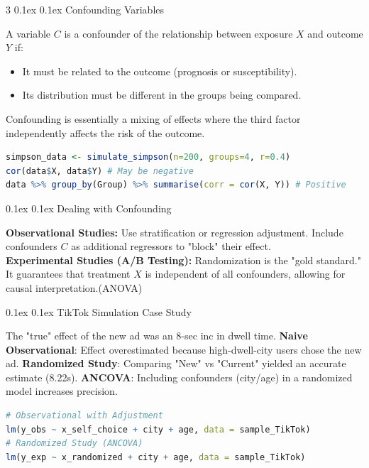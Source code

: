 \documentclass[8pt,landscape]{article}
\makeatletter
\renewcommand{\section}{\@startsection{section}{2}{0pt}%
    {0.1ex}%
    {0.1ex}%
    {\fontsize{8}{9}\bfseries\color{red}}} %
\newcommand{\smalltext}[1]{
  {\fontsize{8}{9}\selectfont\sloppy #1\par}
}
\makeatother
\begin{document}
\begin{multicols}{3}
\section{Confounding Variables}
\smalltext{
A variable $C$ is a confounder of the relationship between exposure $X$ and outcome $Y$ if:
\begin{itemize}
\item It must be related to the outcome (prognosis or susceptibility).
\item Its distribution must be different in the groups being compared.
\end{itemize}
Confounding is essentially a mixing of effects where the third factor independently affects the risk of the outcome.
}

\begin{lstlisting}[language=R]
simpson_data <- simulate_simpson(n=200, groups=4, r=0.4)
cor(data$X, data$Y) # May be negative
data %>% group_by(Group) %>% summarise(corr = cor(X, Y)) # Positive
\end{lstlisting}

\section{Dealing with Confounding}
\smalltext{
\textbf{Observational Studies:} Use stratification or regression adjustment. Include confounders $C$ as additional regressors to "block" their effect. \\
\textbf{Experimental Studies (A/B Testing):} Randomization is the "gold standard." It guarantees that treatment $X$ is independent of all confounders, allowing for causal interpretation.(ANOVA)
}

\section{TikTok Simulation Case Study}
\smalltext{
The "true" effect of the new ad was an 8-sec inc in dwell time.
\textbf{Naive Observational}: Effect overestimated because high-dwell-city users chose the new ad.
\textbf{Randomized Study}: Comparing "New" vs "Current" yielded an accurate estimate (8.22s).
\textbf{ANCOVA}: Including confounders (city/age) in a randomized model increases precision.
}

\begin{lstlisting}[language=R]
# Observational with Adjustment
lm(y_obs ~ x_self_choice + city + age, data = sample_TikTok)
# Randomized Study (ANCOVA)
lm(y_exp ~ x_randomized + city + age, data = sample_TikTok)
\end{lstlisting}


\end{multicols}
\end{document}
